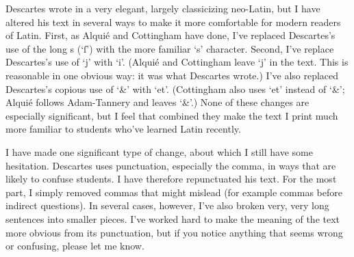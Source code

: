 Descartes wrote in a very elegant, largely classicizing neo-Latin, but I have altered his text in several ways to make it more comfortable for modern readers of Latin. First, as Alquié and Cottingham have done, I've replaced Descartes's use of the long s (`ſ') with the more familiar `s' character. Second, I've replace Descartes's use of `j' with `i'. (Alquié and Cottingham leave `j' in the text. This is reasonable in one obvious way: it was what Descartes wrote.) I've also replaced Descartes's copious use of `\&' with `et'. (Cottingham also uses `et' instead of `\&'; Alquié follows Adam-Tannery and leaves `\&'.) None of these changes are especially significant, but I feel that combined they make the text I print much more familiar to students who've learned Latin recently.

I have made one significant type of change, about which I still have some hesitation. Descartes uses punctuation, especially the comma, in ways that are likely to confuse students. I have therefore repunctuated his text. For the most part, I simply removed commas that might mislead (for example commas before indirect questions). In several cases, however, I've also broken very, very long sentences into smaller pieces. I've worked hard to make the meaning of the text more obvious from its punctuation, but if you notice anything that seems wrong or confusing, please let me know.
